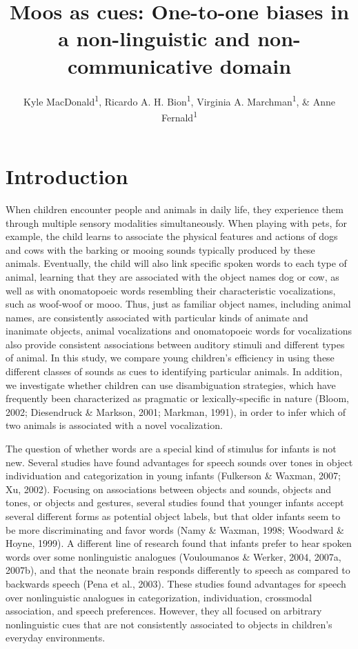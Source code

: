 \documentclass[english,floatsintext,man]{apa6}
\title{Moos as cues: One-to-one biases in a non-linguistic and
non-communicative domain}
\author{Kyle MacDonald\textsuperscript{1}, Ricardo A. H. Bion\textsuperscript{1}, Virginia A. Marchman\textsuperscript{1}, \& Anne Fernald\textsuperscript{1}}
\affiliation{
    \vspace{0.5cm}
          \textsuperscript{1} Stanford University  }
\theoremstyle{definition}
\theoremstyle{definition}
\theoremstyle{definition}
\theoremstyle{remark}
\begin{document}
\maketitle

\setcounter{secnumdepth}{0}



\section{Introduction}\label{introduction}

When children encounter people and animals in daily life, they
experience them through multiple sensory modalities simultaneously. When
playing with pets, for example, the child learns to associate the
physical features and actions of dogs and cows with the barking or
mooing sounds typically produced by these animals. Eventually, the child
will also link specific spoken words to each type of animal, learning
that they are associated with the object names dog or cow, as well as
with onomatopoeic words resembling their characteristic vocalizations,
such as woof-woof or mooo. Thus, just as familiar object names,
including animal names, are consistently associated with particular
kinds of animate and inanimate objects, animal vocalizations and
onomatopoeic words for vocalizations also provide consistent
associations between auditory stimuli and different types of animal. In
this study, we compare young children's efficiency in using these
different classes of sounds as cues to identifying particular animals.
In addition, we investigate whether children can use disambiguation
strategies, which have frequently been characterized as pragmatic or
lexically-specific in nature (Bloom, 2002; Diesendruck \& Markson, 2001;
Markman, 1991), in order to infer which of two animals is associated
with a novel vocalization.

The question of whether words are a special kind of stimulus for infants
is not new. Several studies have found advantages for speech sounds over
tones in object individuation and categorization in young infants
(Fulkerson \& Waxman, 2007; Xu, 2002). Focusing on associations between
objects and sounds, objects and tones, or objects and gestures, several
studies found that younger infants accept several different forms as
potential object labels, but that older infants seem to be more
discriminating and favor words (Namy \& Waxman, 1998; Woodward \& Hoyne,
1999). A different line of research found that infants prefer to hear
spoken words over some nonlinguistic analogues (Vouloumanos \& Werker,
2004, 2007a, 2007b), and that the neonate brain responds differently to
speech as compared to backwards speech (Pena et al., 2003). These
studies found advantages for speech over nonlinguistic analogues in
categorization, individuation, crossmodal association, and speech
preferences. However, they all focused on arbitrary nonlinguistic cues
that are not consistently associated to objects in children's everyday
environments.
\end{document}
